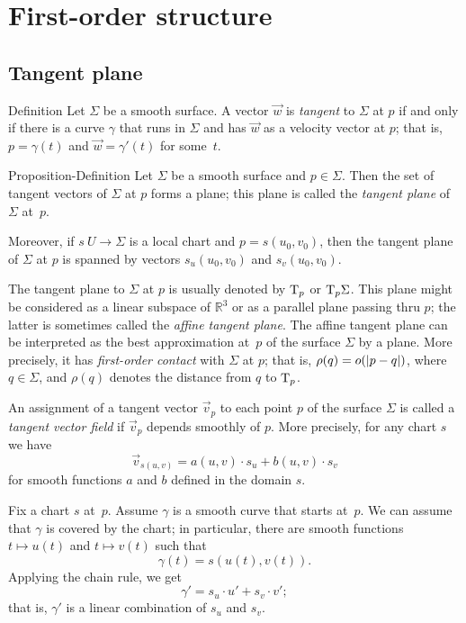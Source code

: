 \chapter{First-order structure}
\label{chap:first-order}
\section{Tangent plane}

\begin{thm}{Definition}\label{def:tangent-vector}
Let $\Sigma$ be a smooth surface.
A vector $\vec w$ is \emph{tangent} to $\Sigma$ at $p$ if and only if there is a curve $\gamma$ that runs in $\Sigma$ and has $\vec w$ as a velocity vector at $p$;
that is, $p=\gamma(t)$ and $\vec w=\gamma'(t)$ for some~$t$.
\end{thm}

\begin{thm}{Proposition-Definition}\label{def:tangent-plane}
Let $\Sigma$ be a smooth surface and $p\in \Sigma$.
Then the set of tangent vectors of $\Sigma$ at $p$ forms a plane;
this plane is called the \emph{tangent plane} of $\Sigma$ at~$p$.

Moreover, if $s\:U\to \Sigma$ is a local chart and $p=s(u_0,v_0)$, then 
the tangent plane of $\Sigma$ at $p$ is spanned by vectors $s_u(u_0,v_0)$ and $s_v(u_0,v_0)$.
\end{thm}

The tangent plane to $\Sigma$ at $p$ is usually denoted by $\mathrm{T}_p$ or $\mathrm{T}_p\Sigma$.
This plane might be considered as a linear subspace of $\mathbb{R}^3$ or as a parallel plane passing thru $p$;
the latter is sometimes called the \emph{affine tangent plane}.
The affine tangent plane can be interpreted as the best approximation at~$p$ of the surface $\Sigma$ by a plane.
More precisely, 
it has \emph{first-order contact} with $\Sigma$ at $p$;
that is, $\rho(q)\z=o(|p-q|)$, where $q\in \Sigma$, and $\rho(q)$ denotes the distance from $q$ to $\mathrm{T}_p$.

An assignment of a tangent vector $\vec v_p$ to each point $p$ of the surface $\Sigma$ is called a \emph{tangent vector field} if $\vec v_p$ depends smoothly of $p$.
More precisely, for any chart $s$ we have
\[\vec v_{s(u,v)}=a(u,v)\cdot s_u+b(u,v)\cdot s_v\]
for smooth functions $a$ and $b$ defined in the domain $s$.

Fix a chart $s$ at~$p$.
Assume $\gamma$ is a smooth curve that starts at~$p$.
We can assume that $\gamma$ is covered by the chart;
in particular, there are smooth functions $t\mapsto u(t)$ and $t\mapsto v(t)$ such that 
\[\gamma(t)=s(u(t),v(t)).\]
Applying the chain rule, we get
\[\gamma'=s_u\cdot u'+ s_v\cdot v';\]
that is, $\gamma'$ is a linear combination of $s_u$ and $s_v$.

